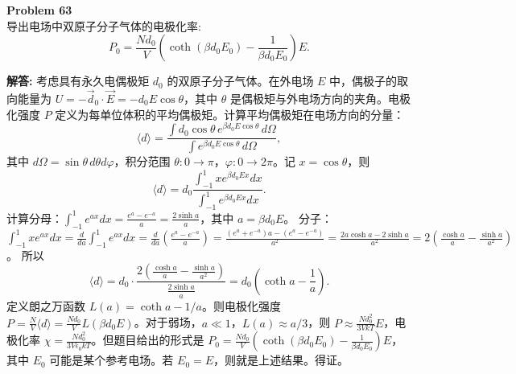 \documentclass[12pt, a4paper, oneside]{ctexart}
\newenvironment{solution}{\par\noindent\textbf{解答:}\quad}{\par}
\begin{document}
\begin{mdframed}[backgroundcolor=gray!10, linewidth=0pt]
    \textbf{Problem 63} \\
    导出电场中双原子分子气体的电极化率:
    \[
    P_0 = \frac{N d_0}{V} \left( \coth(\beta d_0 E_0) - \frac{1}{\beta d_0 E_0} \right) E.
    \]
\end{mdframed}
\begin{solution}
    考虑具有永久电偶极矩 $d_0$ 的双原子分子气体。在外电场 $E$ 中，偶极子的取向能量为 $U = -\vec{d}_0 \cdot \vec{E} = -d_0 E \cos\theta$，其中 $\theta$ 是偶极矩与外电场方向的夹角。电极化强度 $P$ 定义为每单位体积的平均偶极矩。计算平均偶极矩在电场方向的分量：
    \[
    \langle d \rangle = \frac{\int d_0 \cos\theta \, e^{\beta d_0 E \cos\theta} \, d\Omega}{\int e^{\beta d_0 E \cos\theta} \, d\Omega},
    \]
    其中 $d\Omega = \sin\theta \, d\theta d\varphi$，积分范围 $\theta: 0 \to \pi$，$\varphi: 0 \to 2\pi$。记 $x = \cos\theta$，则
    \[
    \langle d \rangle = d_0 \frac{\int_{-1}^{1} x e^{\beta d_0 E x} dx}{\int_{-1}^{1} e^{\beta d_0 E x} dx}.
    \]
    计算分母：$\int_{-1}^{1} e^{a x} dx = \frac{e^a - e^{-a}}{a} = \frac{2 \sinh a}{a}$，其中 $a = \beta d_0 E$。
    分子：$\int_{-1}^{1} x e^{a x} dx = \frac{d}{da} \int_{-1}^{1} e^{a x} dx = \frac{d}{da} \left( \frac{e^a - e^{-a}}{a} \right) = \frac{(e^a + e^{-a})a - (e^a - e^{-a})}{a^2} = \frac{2a \cosh a - 2 \sinh a}{a^2} = 2 \left( \frac{\cosh a}{a} - \frac{\sinh a}{a^2} \right)$。
    所以
    \[
    \langle d \rangle = d_0 \cdot \frac{2 \left( \frac{\cosh a}{a} - \frac{\sinh a}{a^2} \right)}{\frac{2 \sinh a}{a}} = d_0 \left( \coth a - \frac{1}{a} \right).
    \]
    定义朗之万函数 $L(a) = \coth a - 1/a$。则电极化强度 $P = \frac{N}{V} \langle d \rangle = \frac{N d_0}{V} L(\beta d_0 E)$。对于弱场，$a \ll 1$，$L(a) \approx a/3$，则 $P \approx \frac{N d_0^2}{3V kT} E$，电极化率 $\chi = \frac{N d_0^2}{3V \epsilon_0 kT}$。但题目给出的形式是 $P_0 = \frac{N d_0}{V} \left( \coth(\beta d_0 E_0) - \frac{1}{\beta d_0 E_0} \right) E$，其中 $E_0$ 可能是某个参考电场。若 $E_0 = E$，则就是上述结果。得证。
\end{solution}
\end{document}
